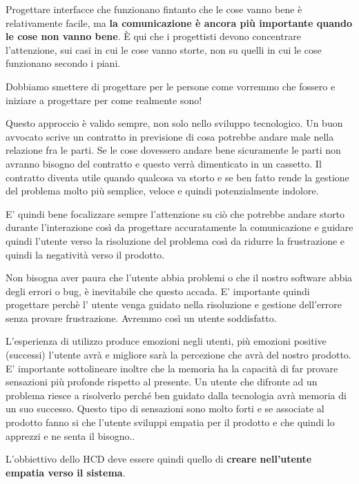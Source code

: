 Progettare interfacce che funzionano fintanto che le cose vanno bene è relativamente facile, ma \textbf{la comunicazione è ancora più importante quando le cose non vanno bene}. È qui che i progettisti devono concentrare l'attenzione, sui casi in cui le cose vanno storte, non su quelli in cui le cose funzionano secondo i piani. 


Dobbiamo smettere di progettare per le persone come vorremmo che fossero e iniziare a progettare per come realmente sono!

Questo approccio è valido sempre, non solo nello sviluppo tecnologico. Un buon avvocato scrive un contratto in previsione di cosa potrebbe andare male nella relazione fra le parti. Se le cose dovessero andare bene sicuramente le parti non avranno bisogno del contratto e questo verrà dimenticato in un cassetto. Il contratto diventa utile quando qualcosa va storto e se ben fatto rende la gestione del problema molto più semplice, veloce e quindi potenzialmente indolore. 

E' quindi bene focalizzare sempre l'attenzione su ciò che potrebbe andare storto durante l'interazione così da progettare accuratamente la comunicazione e guidare quindi l'utente verso la risoluzione del problema così da ridurre la frustrazione e quindi la negatività verso il prodotto. 

Non bisogna aver paura che l'utente abbia problemi o che il nostro software abbia degli errori o bug, è inevitabile che questo accada. E' importante quindi progettare perchè l' utente venga guidato nella risoluzione e gestione dell'errore senza provare frustrazione. Avremmo così un utente soddisfatto. 

L'esperienza di utilizzo produce emozioni negli utenti, più emozioni positive (successi) l'utente avrà e migliore sarà la percezione che avrà del nostro prodotto. E' importante sottolineare inoltre che la memoria ha la capacità di far provare sensazioni più profonde rispetto al presente. Un utente che difronte ad un problema riesce a risolverlo perché ben guidato dalla tecnologia avrà memoria di un suo successo. Questo tipo di sensazioni sono molto forti e se associate al prodotto fanno si che l'utente sviluppi empatia per il prodotto e che quindi lo apprezzi e ne senta il bisogno..

L'obbiettivo dello HCD deve essere quindi quello di \textbf{creare nell'utente empatia verso il sistema}.


